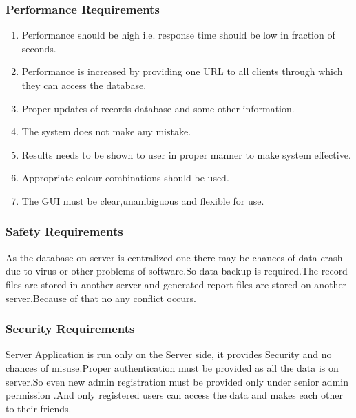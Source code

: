 \documentclass[11pt,fleqn]{book} %
\begin{document}
\subsubsection{\color{ocre!80}Performance Requirements}
\begin{enumerate}
\item Performance should be high i.e. response time should be low in fraction of seconds.
\item Performance is increased by providing one URL to all clients through which they can access the  database.
\item Proper updates of records database and some other information.
\item The system does not make any mistake.
\item Results needs to be shown to user in proper manner to make system effective. 
\item Appropriate colour combinations should be used.
\item The GUI must be clear,unambiguous and ﬂexible for use.
\end{enumerate}
\subsubsection{\color{ocre}Safety Requirements}
As the database on server is centralized one there may be chances of data crash due to virus or other problems of software.So data backup is required.The record ﬁles are stored in another server and generated report files are stored on another server.Because of that no any conﬂict occurs.
\subsubsection{\color{ocre}Security Requirements}
Server Application is run only on the Server side, it provides Security and no chances of misuse.Proper authentication must be provided as all the data is on server.So even new admin registration must be provided only under senior admin permission .And only registered users can access the data and makes each other to their friends.
\end{document}
